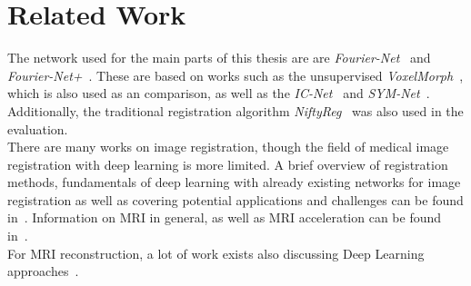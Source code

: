 \documentclass[english,version-2022-01]{uzl-thesis} %
\begin{document}
\section{Related Work} \label{Sec:RelatedWork}
The network used for the main parts of this thesis are are \emph{Fourier-Net}~\cite{Fourier-Net} and \emph{Fourier-Net+}~\cite{Fourier-Net+}. These are based on works such as the unsupervised \emph{VoxelMorph}~\cite{Voxelmorph}, which is also used as an comparison, as well as the \emph{IC-Net}~\cite{IC-Net} and \emph{SYM-Net}~\cite{SYM-Net}. Additionally, the traditional registration algorithm \emph{NiftyReg}~\cite{NiftiReg} was also used in the evaluation.\\
There are many works on image registration, though the field of medical image registration with deep learning is more limited. A brief overview of registration methods, fundamentals of deep learning with already existing networks for image registration as well as covering potential applications and challenges can be found in~\cite{Chen2020,Haskins2020,Fu2020,Zou2022,Chen2023}. Information on MRI in general, as well as MRI acceleration can be found in~\cite{Serai2021,SamplingStrategies,PulseSequences,AdvancesPI,CS-MRI}.\\
For MRI reconstruction, a lot of work exists also discussing Deep Learning approaches~\cite{DeepMRIReconstructionRadialSubsampling,DeepMRIReconstructionSubsampling}.
\end{document}
